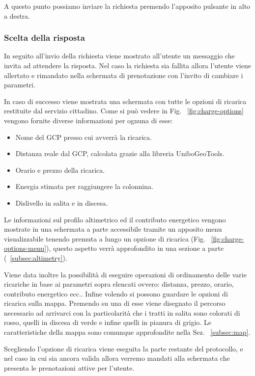 A questo punto possiamo inviare la richiesta premendo l'apposito pulsante in alto a destra.

\subsubsection{Scelta della risposta}

In seguito all'invio della richiesta viene mostrato all'utente un messaggio che invita ad attendere la risposta. Nel caso la richiesta sia fallita allora l'utente viene allertato e rimandato nella schermata di prenotazione con l'invito di cambiare i parametri.

In caso di successo viene mostrata una schermata con tutte le opzioni di ricarica restituite dal servizio cittadino. Come si può vedere in Fig. ~\ref{fig:charge-options} vengono fornite diverse informazioni per ognuna di esse:

\begin{itemize}
	\item Nome del GCP presso cui avverrà la ricarica.
	\item Distanza reale dal GCP, calcolata grazie alla libreria UniboGeoTools.
	\item Orario e prezzo della ricarica.
	\item Energia stimata per raggiungere la colonnina.
	\item Dislivello in salita e in discesa.
\end{itemize}

Le informazioni sul profilo altimetrico ed il contributo energetico vengono mostrate in una schermata a parte accessibile tramite un apposito menu visualizzabile tenendo premuta a lungo un opzione di ricarica (Fig. ~\ref{fig:charge-options-menu}), questo aspetto verrà approfondito in una sezione a parte (~\ref{subsec:altimetry}).

Viene data inoltre la possibilità di eseguire operazioni di ordinamento delle varie ricariche in base ai parametri sopra elencati ovvero: distanza, prezzo, orario, contributo energetico ecc.. Infine volendo si possono guardare le opzioni di ricarica sulla mappa. Premendo su una di esse viene disegnato il percorso necessario ad arrivarci con la particolarità che i tratti in salita sono colorati di rosso, quelli in discesa di verde e infine quelli in pianura di grigio. Le caratteristiche della mappa sono comunque approfondite nella Sez. ~\ref{subsec:map}.

Scegliendo l'opzione di ricarica viene eseguita la parte restante del protocollo, e nel caso in cui sia ancora valida allora verremo mandati alla schermata che presenta le prenotazioni attive per l'utente.

